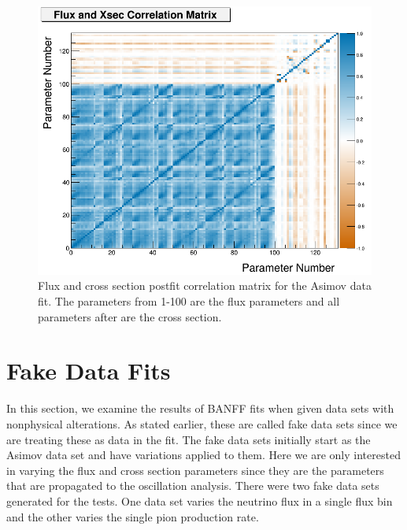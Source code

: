 \begin{figure}
\begin{centering}
\includegraphics[height=0.4\textheight]{Chapters/Figures/Validation/Asimov/corr_flux_xsec}
\par\end{centering}
\caption[Flux and Cross Section Postfit Correlation Matrix for the Asimov Data
Fit]{Flux and cross section postfit correlation matrix for the Asimov data
fit. The parameters from 1-100 are the flux parameters and all parameters
after are the cross section. \label{fig:XsecFlux-postfit-correlation}}
\end{figure}


\section{Fake Data Fits\label{sec:Fake-Data-Fits}}

In this section, we examine the results of BANFF fits when given data
sets with nonphysical alterations. As stated earlier, these are called
fake data sets since we are treating these as data in the fit. The
fake data sets initially start as the Asimov data set and have variations
applied to them. Here we are only interested in varying the flux and
cross section parameters since they are the parameters that are propagated
to the oscillation analysis. There were two fake data sets generated
for the tests. One data set varies the neutrino flux in a single flux
bin and the other varies the single pion production rate.

